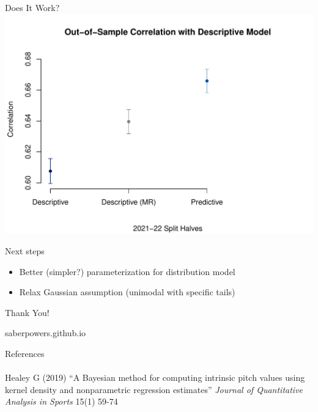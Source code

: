 \documentclass{beamer}
\begin{document}
  \begin{frame}{Does It Work?}
    \centering
    \includegraphics[width = \textwidth]{images/cor_overall_3.pdf}
  \end{frame}

  \begin{frame}{Next steps}
    \begin{itemize}
      \item Better (simpler?) parameterization for distribution model
      \item Relax Gaussian assumption (unimodal with specific tails)
    \end{itemize}
  \end{frame}

  \begin{frame}{Thank You!}
    \begin{center}
      \color{ricerichblue}saberpowers.github.io
    \end{center}
    \vfill
    \footnotesize
    References\\
    ~\\
    Healey G (2019) ``A Bayesian method for computing intrinsic pitch values using kernel density and nonparametric regression estimates'' {\it Journal of Quantitative Analysis in Sports} 15(1) 59-74
  \end{frame}
\end{document}
